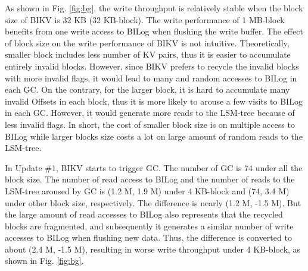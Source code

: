 \documentclass[sigconf]{acmart}
\begin{document}
As shown in Fig. \ref{fig:bg}, the write throughput is relatively stable when the block size of BIKV is 32 KB (32 KB-block). The write performance of 1 MB-block benefits from one write access to BILog when flushing the write buffer. The effect of block size on the write performance of BIKV is not intuitive. Theoretically, smaller block includes less number of KV pairs, thus it is easier to accumulate entirely invalid blocks. However, since BIKV prefers to recycle the invalid blocks with more invalid flags, it would lead to many and random accesses to BILog in each GC. On the contrary, for the larger block, it is hard to accumulate many invalid Offsets in each block, thus it is more likely to arouse a few visits to BILog in each GC. However, it would generate more reads to the LSM-tree because of less invalid flags. In short, the cost of smaller block size is on multiple access to BILog while larger blocks size costs a lot on large amount of random reads to the LSM-tree.

In Update \#1, BIKV starts to trigger GC. The number of GC is 74 under all the block size. The number of read access to BILog and the number of reads to the LSM-tree aroused by GC is (1.2 M, 1.9 M) under 4 KB-block and (74, 3.4 M) under other block size, respectively. The difference is nearly (1.2 M, -1.5 M). But the large amount of read accesses to BILog also represents that the recycled blocks are fragmented, and subsequently it generates a similar number of write accesses to BILog when flushing new data. Thus, the difference is converted to about (2.4 M, -1.5 M), resulting in worse write throughput under 4 KB-block, as shown in Fig. \ref{fig:bg}.
\end{document}
